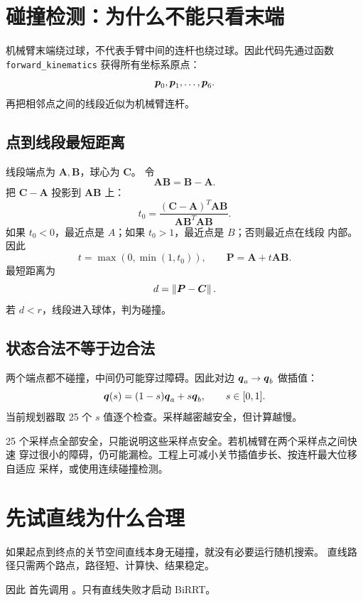 \section{碰撞检测：为什么不能只看末端}

机械臂末端绕过球，不代表手臂中间的连杆也绕过球。因此代码先通过函数
\nolinkurl{forward_kinematics} 获得所有坐标系原点：
\[
\boldsymbol{p}_0,\boldsymbol{p}_1,\ldots,\boldsymbol{p}_6.
\]
再把相邻点之间的线段近似为机械臂连杆。

\subsection{点到线段最短距离}

线段端点为 $\boldsymbol{A},\boldsymbol{B}$，球心为 $\boldsymbol{C}$。
令
\[
\boldsymbol{AB}=\boldsymbol{B}-\boldsymbol{A}.
\]
把 $\boldsymbol{C}-\boldsymbol{A}$ 投影到 $\boldsymbol{AB}$ 上：
\[
t_0=
\frac{(\boldsymbol{C}-\boldsymbol{A})^T\boldsymbol{AB}}
{\boldsymbol{AB}^T\boldsymbol{AB}}.
\]
如果 $t_0<0$，最近点是 $A$；如果 $t_0>1$，最近点是 $B$；否则最近点在线段
内部。因此
\[
t=\max(0,\min(1,t_0)),
\qquad
\boldsymbol{P}=\boldsymbol{A}+t\boldsymbol{AB}.
\]
最短距离为
\[
d=\left\lVert \boldsymbol{P}-\boldsymbol{C}\right\rVert.
\]
若 $d<r$，线段进入球体，判为碰撞。

\subsection{状态合法不等于边合法}

两个端点都不碰撞，中间仍可能穿过障碍。因此对边
$\boldsymbol{q}_a\rightarrow\boldsymbol{q}_b$ 做插值：
\[
\boldsymbol{q}(s)=(1-s)\boldsymbol{q}_a+s\boldsymbol{q}_b,\qquad s\in[0,1].
\]
当前规划器取 25 个 $s$ 值逐个检查。采样越密越安全，但计算越慢。

\begin{dangerbox}[离散检测不是连续数学保证]
25 个采样点全部安全，只能说明这些采样点安全。若机械臂在两个采样点之间快速
穿过很小的障碍，仍可能漏检。工程上可减小关节插值步长、按连杆最大位移自适应
采样，或使用连续碰撞检测。
\end{dangerbox}

\section{先试直线为什么合理}

如果起点到终点的关节空间直线本身无碰撞，就没有必要运行随机搜索。
直线路径只需两个路点，路径短、计算快、结果稳定。

因此  首先调用
。只有直线失败才启动 BiRRT。

